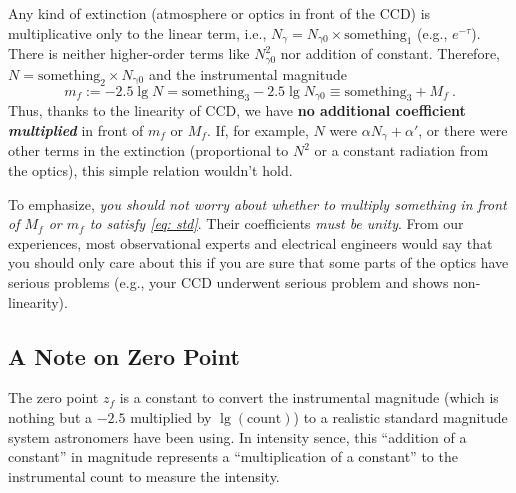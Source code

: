 Any kind of extinction (atmosphere or optics in front of the CCD) is multiplicative only to the linear term, i.e., $ N_\gamma = N_{\gamma 0} \times \mathrm{something_1} $ (e.g., $ e^{-\tau} $). There is neither higher-order terms like $ N_{\gamma 0}^2 $ nor addition of constant. Therefore, $ N = \mathrm{something_2} \times N_\mathrm{\gamma 0} $ and the instrumental magnitude
\begin{equation}
  m_f 
    := -2.5 \lg N 
    = \mathrm{something_3} - 2.5 \lg N_{\gamma 0}
    \equiv \mathrm{something_3} + M_f ~.
\end{equation} 
Thus, thanks to the linearity of CCD, we have \textbf{no additional coefficient \emph{multiplied}} in front of $ m_f $ or $ M_f $. If, for example, $ N $ were $ \alpha N_\gamma + \alpha' $, or there were other terms in the extinction (proportional to $ N^2 $ or a constant radiation from the optics), this simple relation wouldn't hold.


To emphasize, \emph{you should not worry about whether to \emph{multiply} something in front of $ M_f $ or $ m_f $ to satisfy \cref{eq: std}}. Their coefficients \emph{must be unity}. From our experiences, most observational experts and electrical engineers would say that you should only care about this if you are sure that some parts of the optics have serious problems (e.g., your CCD underwent serious problem and shows non-linearity). 

\subsection{A Note on Zero Point} \label{ss: zeropt}
The zero point $ z_{f} $ is a constant to convert the instrumental magnitude (which is nothing but a $ -2.5 $ multiplied by $ \lg (\mathrm{count}) $) to a realistic standard magnitude system astronomers have been using. In intensity sence, this ``addition of a constant'' in magnitude represents a ``multiplication of a constant'' to the instrumental count to measure the intensity. 

